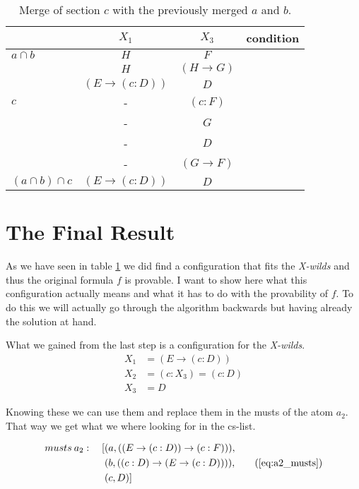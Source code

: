 \begin{table}[H]
\centering
\begin{tabular}{l c c r}
		& $X_1$ & $X_3$ & condition \\
	\hline
	$a \cap b$	& $H$ & $F$ & \\
		& $H$ & $(H \rightarrow G)$ & \\
		& $(E \rightarrow (c:D))$ & $D$ & \\
	\hline
	$c$	& - & $(c:F)$ & \\
		& - & $G$ & \\
		& - & $D$ & \\
		& - & $(G \rightarrow F)$ &\\
	\hline
	\hline
	$(a \cap b) \cap c$ & $(E \rightarrow (c:D))$ & $D$ \\
	\hline

\end{tabular}
\caption{Merge of section $c$ with the previously merged $a$ and $b$.}\label{merge_a_b_c}
\end{table}

\section{The Final Result}
As we have seen in table \ref{merge_a_b_c} we did find a configuration that fits the \emph{X-wilds} and thus the original formula $f$ is provable. I want to show here what this configuration actually means and what it has to do with the provability of $f$. To do this we will actually go through the algorithm backwards but having already the solution at hand.

What we gained from the last step is a configuration for the \emph{X-wilds}.
\begin{equation}
	\begin{split}
	X_1 & = (E \rightarrow (c:D))\\
	X_2 & = (c:X_3) = (c:D) \\
	X_3 & = D 
	\end{split}	
\end{equation}

Knowing these we can use them and replace them in the musts of the atom $a_2$. That way we get what we where looking for in the cs-list.

\begin{equation*}
\begin{split}
	musts \medspace a_2: \quad  [&(a, ((E \rightarrow (c:D)) \rightarrow (c:F))), \\
			& (b, ((c:D) \rightarrow (E \rightarrow (c:D)))), \\
			& (c, D)]
\end{split}
\tag{\ref{eq:a2_musts}}
\end{equation*}

